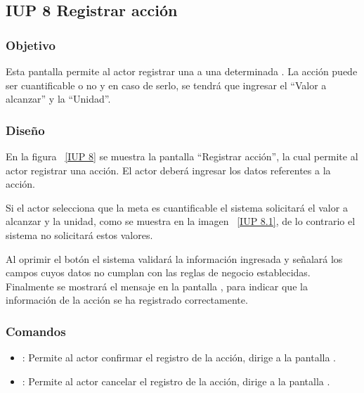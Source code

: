 \subsection{IUP 8 Registrar acción}
                     
\subsubsection{Objetivo}

   Esta pantalla permite al actor registrar una  a una determinada . La acción puede ser cuantificable o no y en caso de serlo, se tendrá que
   ingresar el ``Valor a alcanzar'' y la ``Unidad''.

	
\subsubsection{Diseño}

  En la figura ~\ref{IUP 8} se muestra la pantalla ``Registrar acción'', la cual permite al actor registrar una acción. 
  El actor deberá ingresar los datos referentes a la acción.\\
 
  
  Si el actor selecciona que la meta es cuantificable el sistema solicitará  el valor a alcanzar y la unidad, como se muestra en la imagen ~\ref{IUP 8.1}, de lo contrario
  el sistema no solicitará estos valores.
    

  Al oprimir el botón  el sistema validará la información ingresada y señalará los campos cuyos datos no cumplan con las reglas de negocio establecidas.\\
  
  Finalmente se mostrará el mensaje  en la pantalla , para indicar que la información de la acción se ha registrado correctamente.
    
\subsubsection{Comandos}
\begin{itemize}
	\item {}: Permite al actor confirmar el registro de la acción, dirige a la pantalla .
	\item {}: Permite al actor cancelar el registro de la acción, dirige a la pantalla .
\end{itemize}


